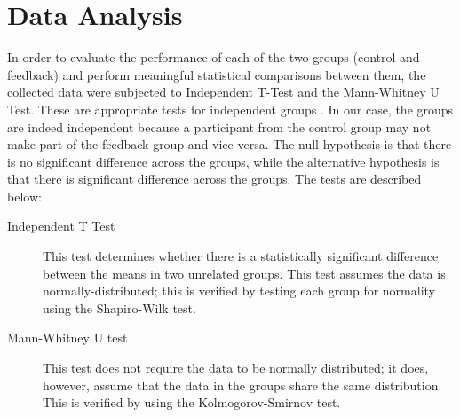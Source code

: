 \section{Data Analysis}
\label{sec:meth-data-analysis}
In order to evaluate the performance of each of the two groups (control and feedback) and perform meaningful statistical comparisons between them, the collected data were subjected to Independent T-Test\cite{student1908probable} and the Mann-Whitney U Test\cite{mann1947test}. These are appropriate tests for independent groups \cite{de2015statsref}. In our case, the groups are indeed independent because a participant from the control group may not make part of the feedback group and vice versa. The null hypothesis is that there is no significant difference across the groups, while the alternative hypothesis is that there is significant difference across the groups. The tests are described below:


\begin{description}
	\item[Independent T Test] This test determines whether there is a statistically significant difference between the means in two unrelated groups. This test assumes the data is normally-distributed; this is verified by testing each group for normality using the Shapiro-Wilk\cite{shapiro1965analysis} test.
	
%	
	\item[Mann-Whitney U test] This test does not require the data to be normally distributed; it does, however, assume that the data in the groups share the same distribution. This is verified by using the Kolmogorov-Smirnov \cite{kolmogorov1933sulla} test.
	
\end{description}
	
